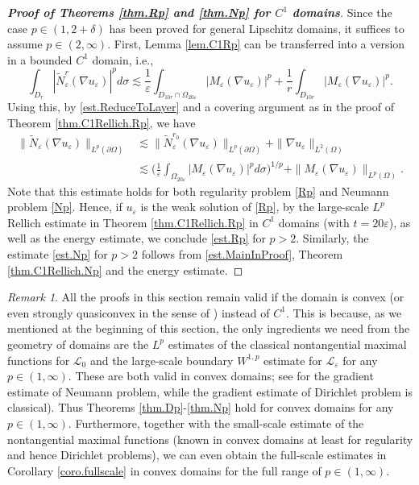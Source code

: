 \documentclass[reqno,12pt]{amsart} %
\theoremstyle{definition}
\theoremstyle{remark}
\newtheorem{remark}[theorem]{Remark}
\numberwithin{equation}{section}
\newcommand{\cL}{\mathcal{L}}
\newcommand{\e}{\varepsilon}
\begin{document}
\begin{proof}[\textbf{Proof of Theorems \ref{thm.Rp} and \ref{thm.Np} for $C^1$ domains}]
    Since the case $p\in (1,2+\delta)$ has been proved for general Lipschitz domains, it suffices to assume $p\in (2,\infty)$. First, Lemma \ref{lem.C1Rp} can be transferred into a version in a bounded $C^1$ domain, i.e.,
    \begin{equation}
    \int_{D_r} |\widetilde{N}_\e^r(\nabla u_\e)|^p d\sigma \lesssim \frac{1}{\e} \int_{D_{10r} \cap \Omega_{20\e}} |M_\e(\nabla u_\e)|^p + \frac{1}{r} \int_{D_{10r}} |M_\e(\nabla u_\e)|^p.
\end{equation}
    Using this, by \eqref{est.ReduceToLayer} and a covering argument as in the proof of Theorem \ref{thm.C1Rellich.Rp}, we have
    \begin{equation}\label{est.MainInProof}
        \begin{aligned}
            \| \widetilde{N}_\e(\nabla u_\e) \|_{L^p(\partial \Omega)} 
           & \lesssim \| \widetilde{N}_\e^{r_0}(\nabla u_\e) \|_{L^p(\partial \Omega)}  + \| \nabla u_\e \|_{L^2(\Omega)} \\
           & \lesssim \bigg( \frac{1}{\e} \int_{\Omega_{20\e}} |M_\e(\nabla u_\e)|^p d\sigma \bigg)^{1/p} + \| M_\e(\nabla u_\e) \|_{L^p(\Omega)}.
        \end{aligned}
    \end{equation}
    Note that this estimate holds for both regularity problem \eqref{Rp} and  Neumann problem \eqref{Np}. Hence, if $u_\e$ is the weak solution of \eqref{Rp}, by the large-scale $L^p$ Rellich estimate in Theorem \ref{thm.C1Rellich.Rp} in $C^1$ domains (with $t = 20\e$), as well as the energy estimate, we conclude \eqref{est.Rp} for $p>2$. Similarly, the estimate \eqref{est.Np} for $p>2$ follows from \eqref{est.MainInProof}, Theorem \ref{thm.C1Rellich.Np} and the energy estimate.
\end{proof}

\begin{remark}\label{rmk.convex}
    All the proofs in this section remain valid if the domain is convex (or even strongly quasiconvex in the sense of \cite[Definition 1.8]{FLZ26}) instead of $C^1$. This is because, as we mentioned at the beginning of this section, the only ingredients we need from the geometry of domains are the $L^p$ estimates of the classical nontangential maximal functions for $\cL_0$ and the large-scale boundary $W^{1,p}$ estimate for $\cL_\e$ for any $p\in (1,\infty)$. These are both valid in convex domains; see \cite{Mazya2009,Geng2010} for the gradient estimate of Neumann problem, while the gradient estimate of Dirichlet problem is classical). Thus Theorems \ref{thm.Dp}-\ref{thm.Np} hold for convex domains for any $p\in (1,\infty)$. Furthermore, together with the small-scale estimate of the nontangential maximal functions (known in convex domains at least for regularity and hence Dirichlet problems), we can even obtain the full-scale estimates in Corollary \ref{coro.fullscale} in convex domains for the full range of $p\in (1,\infty)$.
\end{remark}
\end{document}
